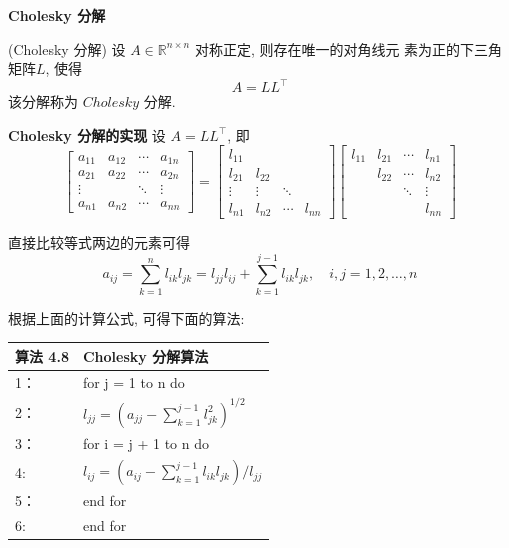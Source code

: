 \documentclass[12pt,a4paper]{article}
\begin{document}
{\bfseries Cholesky 分解}


\begin{theorem}(Cholesky 分解)
	设 $A ∈ \mathbb{R}^{n×n}$ 对称正定, 则存在唯一的对角线元
	素为正的下三角矩阵$ L$, 使得
	$$
	A=L L^{\top}
	$$
	该分解称为 $Cholesky$ 分解.	
\end{theorem}


{\bfseries Cholesky 分解的实现}
设 $A = LL^{⊺}$, 即
\begin{equation}
\left[\begin{array}{cccc}{a_{11}} & {a_{12}} & {\cdots} & {a_{1 n}} \\ {a_{21}} & {a_{22}} & {\cdots} & {a_{2 n}} \\ {\vdots} & {} & {\ddots} & {\vdots} \\ {a_{n 1}} & {a_{n 2}} & {\cdots} & {a_{n n}}\end{array}\right]=\left[\begin{array}{cccc}{l_{11}} & {} & {} & {} \\ {l_{21}} & {l_{22}} & {} & {} \\ {\vdots} & {\vdots} & {\ddots} & {} \\ {l_{n 1}} & {l_{n 2}} & {\cdots} & {l_{n n}}\end{array}\right]\left[\begin{array}{cccc}{l_{11}} & {l_{21}} & {\cdots} & {l_{n 1}} \\ {} & {l_{22}} & {\cdots} & {l_{n 2}} \\{}& {} & {\ddots} & {\vdots} \\{} &{} & {} & {l_{n n}}\end{array}\right]
\end{equation}

直接比较等式两边的元素可得
\begin{equation}
a_{i j}=\sum_{k=1}^{n} l_{i k} l_{j k}=l_{j j} l_{i j}+\sum_{k=1}^{j-1} l_{i k} l_{j k}, \quad i, j=1,2, \ldots, n
\end{equation}

根据上面的计算公式, 可得下面的算法:

\begin{table}  
	\begin{tabular*}{16cm}{ll}  
		\hline  
		算法 4.8 & Cholesky 分解算法\\  
		\hline  
		1：   & for j = 1 to n do\\  
		2：   & \qquad $l_{j j}=\left(a_{j j}-\sum_{k=1}^{j-1} l_{j k}^{2}\right)^{1 / 2}$\\
		3：   & \qquad for i = j + 1 to n do\\
		4:    & \qquad \qquad$l_{i j}=\left(a_{i j}-\sum_{k=1}^{j-1} l_{i k} l_{j k}\right) / l_{j j}$\\
		5：   & \qquad end for\\
		6:    & end for\\
		\hline  
	\end{tabular*}  
\end{table}
\end{document}
